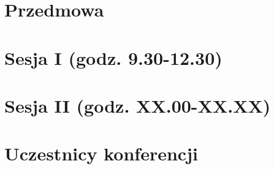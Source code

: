 \documentclass[12pt,oneside]{book}
\begin{document}
\chapter{Przedmowa}



\tableofcontents
\mainmatter

\pagestyle{mainmatter}%

\chapter{Sesja I (godz. 9.30-12.30)}
\large
\vspace{0.5cm}

\newpage

\newpage

\newpage

\newpage


\chapter{Sesja II (godz. XX.00-XX.XX)}

\newpage




\chapter{Uczestnicy konferencji}



\backmatter
\printindex[a]
\printindex[p]


%
\end{document}
